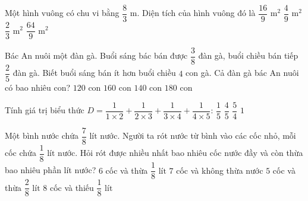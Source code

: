 \begin{ex} %
Một hình vuông có chu vi bằng $\dfrac{8}{3}\text{ m}$. Diện tích của hình vuông đó là
\choice
{$\dfrac{16}{9}\text{ m}^2$}
{\True $\dfrac{4}{9}\text{ m}^2$}
{$\dfrac{2}{3}\text{ m}^2$}
{$\dfrac{64}{9}\text{ m}^2$}
\end{ex}

\begin{ex} %
Bác An nuôi một đàn gà. Buổi sáng bác bán được $\dfrac{3}{8}$ đàn gà, buổi chiều bán tiếp $\dfrac{2}{5}$ đàn gà. Biết buổi sáng bán ít hơn buổi chiều $4$ con gà. Cả đàn gà bác An nuôi có bao nhiêu con?
\choice
{$120$ con}
{\True $160$ con}
{$140$ con}
{$180$ con}
\end{ex}

\begin{ex} %
Tính giá trị biểu thức $D = \dfrac{1}{1 \times 2} + \dfrac{1}{2 \times 3} + \dfrac{1}{3 \times 4} + \dfrac{1}{4 \times 5}$:
\choice
{$\dfrac{1}{5}$}
{\True $\dfrac{4}{5}$}
{$\dfrac{5}{4}$}
{$1$}
\end{ex}

\begin{ex} %
Một bình nước chứa $\dfrac{7}{8}\text{ lít}$ nước. Người ta rót nước từ bình vào các cốc nhỏ, mỗi cốc chứa $\dfrac{1}{8}\text{ lít}$ nước. Hỏi rót được nhiều nhất bao nhiêu cốc nước đầy và còn thừa bao nhiêu phần lít nước?
\choice
{$6$ cốc và thừa $\dfrac{1}{8}\text{ lít}$}
{\True $7$ cốc và không thừa nước}
{$5$ cốc và thừa $\dfrac{2}{8}\text{ lít}$}
{$8$ cốc và thiếu $\dfrac{1}{8}\text{ lít}$}
\end{ex}

